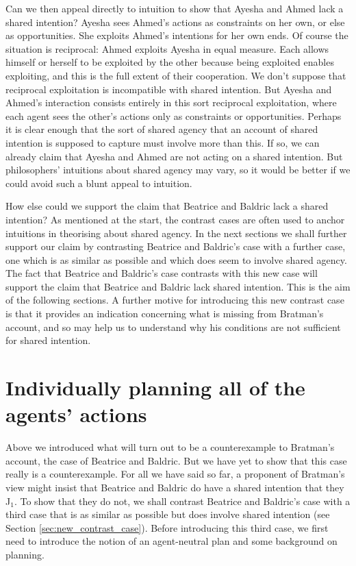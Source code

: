 \documentclass[12pt,\papersize]{extarticle}
\begin{document}
Can we then appeal directly to intuition to show that Ayesha and Ahmed lack a shared intention?
Ayesha sees Ahmed's actions as constraints on her own, or else as opportunities.
She exploits Ahmed's intentions for her own ends.
Of course the situation is reciprocal: Ahmed exploits Ayesha in equal measure.
Each allows himself or herself to be exploited by the other because being exploited enables exploiting,
and this is the full extent of their cooperation. 
We don't suppose that reciprocal exploitation is incompatible with shared intention. 
But Ayesha and Ahmed's interaction consists entirely in this sort reciprocal exploitation, where each agent sees the other's actions only as constraints or opportunities.
Perhaps it is clear enough that 
the sort of shared agency that an account of shared intention is supposed to capture must involve more than this. 
If so, we can already claim that Ayesha and Ahmed are not acting on a shared intention.
But philosophers' intuitions about shared agency may vary, so it would be better if we could avoid such a blunt appeal to intuition.

How else could we support the claim that Beatrice and Baldric lack a shared intention? 
As mentioned at the start, 
the contrast cases are often used to anchor intuitions in theorising about shared agency.
In the next sections we shall further support our claim by contrasting Beatrice and Baldric's case with a further case, one which is as similar as possible and which does seem to involve shared agency.
The fact that Beatrice and Baldric's case contrasts with this new case will support the claim that Beatrice and Baldric lack shared intention.
This is the aim of the following sections.
A further motive for introducing this new contrast case is that it provides an indication concerning what is missing from Bratman's account, and so may help us to understand why his conditions are not sufficient for shared intention.



\section{Individually planning all of  the agents' actions}
\label{sec:distributed_plan}

Above we introduced what will turn out to be a counterexample to Bratman's account, the case of Beatrice and Baldric. 
But we have yet to show that this case really is a counterexample. 
For all we have said so far, a proponent of Bratman's view might insist that Beatrice and Baldric do have a shared intention that they J$_1$.
To show that they do not,
we shall contrast Beatrice and Baldric's case with a third case that is as similar as possible but does involve shared intention (see Section \vref{sec:new_contrast_case}). 
Before introducing this third case,
we first need to introduce the notion of an agent-neutral plan and some background on planning.
\end{document}
